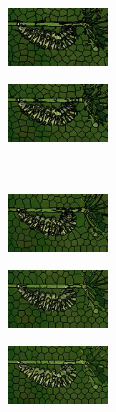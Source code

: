 \begin{figure}
\begin{subfigure}[b]{0.141\textwidth}
	\end{subfigure}
	\begin{subfigure}[b]{0.141\textwidth}
		\includegraphics[height=1.525cm]{pictures/compactness/bsds500/reseeds/score/0.25/cropped/reseeds_35028_contours}
	\end{subfigure}
	\begin{subfigure}[b]{0.141\textwidth}
		\includegraphics[height=1.525cm]{pictures/compactness/bsds500/reseeds/score/0.5/cropped/reseeds_35028_contours}
	\end{subfigure}\\
	\begin{subfigure}[b]{0.02\textwidth}
	\end{subfigure}
	\begin{subfigure}[b]{0.141\textwidth}
		\includegraphics[height=1.525cm]{pictures/compactness/bsds500/vc/score/10/cropped/vc_35028_contours}
	\end{subfigure}
	\begin{subfigure}[b]{0.141\textwidth}
		\includegraphics[height=1.525cm]{pictures/compactness/bsds500/vc/score/25/cropped/vc_35028_contours}
	\end{subfigure}
	\begin{subfigure}[b]{0.141\textwidth}
		\includegraphics[height=1.525cm]{pictures/compactness/bsds500/vc/score/100/cropped/vc_35028_contours}
	\end{subfigure}\\

\end{figure}
